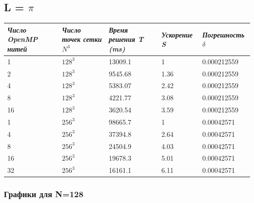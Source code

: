 \documentclass[a4paper,hidelinks,12pt]{article}
\begin{document}
\newpage
\subsection{L = $\pi$}

{
\centering
\noindent\begin{tabular}{|p{2cm}|p{2.5cm}|p{2.5cm}|p{2cm}|p{3cm}|}
    \hline
    \textit{Число OpenMP нитей} & \textit{Число точек сетки }$N^3$ & \textit{Время решения T (ms)} & \textit{Ускорение S} & \textit{Погрешность }$\delta$ \\
    \hline
    1 & $128^3$ & 13009.1 & 1 & 0.000212559 \\
    2 & $128^3$ & 9545.68 & 1.36 & 0.000212559 \\
    4 & $128^3$ & 5383.07 & 2.42 & 0.000212559 \\
    8 & $128^3$ & 4221.77 & 3.08 & 0.000212559 \\
    16 & $128^3$ & 3620.54 & 3.59 & 0.000212559 \\
    \hline
    1 & $256^3$ & 98665.7 & 1 & 0.00042571 \\
    4 & $256^3$ & 37394.8 & 2.64 & 0.00042571 \\
    8 & $256^3$ & 24504.9 & 4.03 & 0.00042571 \\
    16 & $256^3$ & 19678.3 & 5.01 & 0.00042571 \\
    32 & $256^3$ & 16161.1 & 6.11 & 0.00042571 \\
    \hline
\end{tabular}
}

\subsubsection{Графики для N=128}
\end{document}
